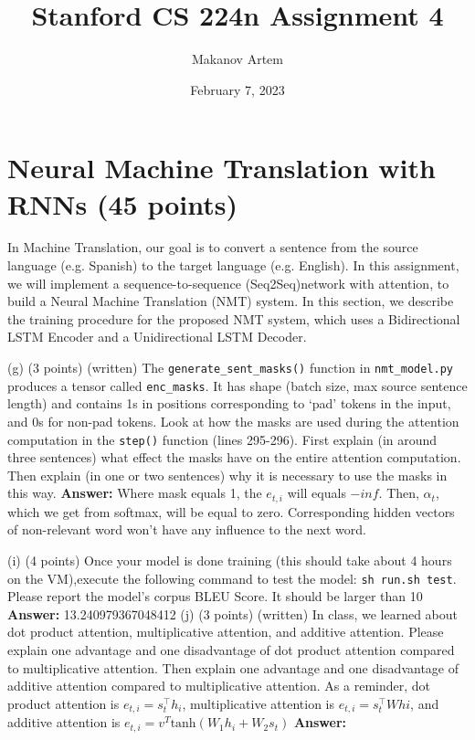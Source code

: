 \documentclass{article}
\title{Stanford CS 224n Assignment 4}
\author{Makanov Artem}
\date{February 7, 2023}
\begin{document}
	
	\maketitle
	\section{Neural Machine Translation with RNNs (45 points)}
	In Machine Translation, our goal is to convert a sentence from the source language (e.g.  Spanish) to the target language (e.g.  English). In this assignment, we will implement a sequence-to-sequence (Seq2Seq)network with attention, to build a Neural Machine Translation  (NMT)  system. In this  section, we describe the training procedure for the proposed NMT system, which uses a Bidirectional LSTM Encoder and a Unidirectional LSTM Decoder.
	
	\bigbreak
	(g)  (3 points)  (written) The \verb|generate_sent_masks()| function in \verb|nmt_model.py| produces a tensor called \verb|enc_masks|. It has shape (batch size, max source sentence length) and contains 1s in positions corresponding to ‘pad’ tokens in the input, and 0s for non-pad tokens.  Look at how the masks are used during the attention computation in the \verb|step()| function (lines 295-296). First explain (in around three sentences) what effect the masks have on the entire attention computation. Then explain (in one or two sentences) why it is necessary to use the masks in this way.
	\smallbreak
	\textbf{Answer:} 
	Where mask equals 1, the $e_{t,i}$ will equals $-inf$. Then, $\alpha_t$, which we get from softmax, will be equal to zero. Corresponding hidden vectors of non-relevant word won't have any influence to the next word.
	
	\bigbreak
	(i) (4 points)  Once your model is done training (this should take about 4 hours on the VM),execute the following command to test the model: \verb|sh run.sh test|. Please report the model’s corpus BLEU Score.  It should be larger than 10
	\smallbreak
	\textbf{Answer:} 
	13.240979367048412
	\bigbreak
	(j) (3 points)  (written) In class, we learned about dot product attention, multiplicative attention, and additive attention.  Please explain one advantage and one disadvantage of dot product attention compared to multiplicative attention.  Then explain one advantage and one disadvantage of additive attention compared to multiplicative attention.  As a reminder, dot product attention is $e_{t,i}=s_t^\intercal h_i$, multiplicative attention is $e_{t,i}=s_t^\intercal W hi$, and additive attention is $e_{t,i}=v^T \text{tanh}(W_1h_i + W_2s_t)$
	\smallbreak
	\textbf{Answer:}
	
\end{document}
